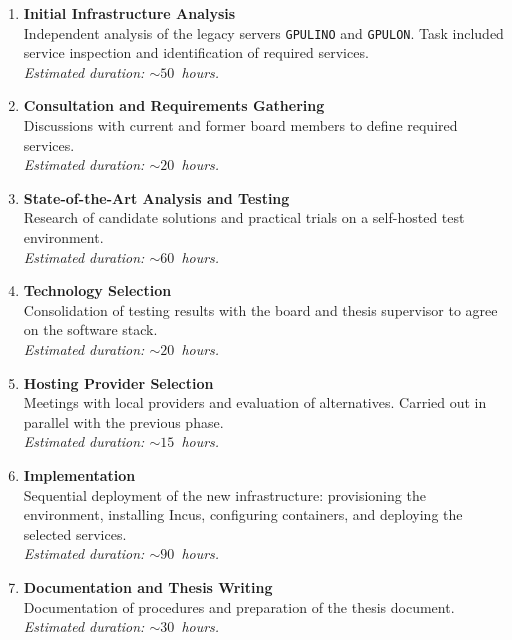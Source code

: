\begin{enumerate}
  \item \textbf{Initial Infrastructure Analysis}\\
  Independent analysis of the legacy servers \texttt{GPULINO} and \texttt{GPULON}. Task included service inspection and identification of required services.\\
  \emph{Estimated duration: \(\sim 50\)~hours.}

  \item \textbf{Consultation and Requirements Gathering}\\
  Discussions with current and former board members to define required services.\\
  \emph{Estimated duration: \(\sim 20\)~hours.}

  \item \textbf{State-of-the-Art Analysis and Testing}\\
  Research of candidate solutions and practical trials on a self-hosted test environment.\\
  \emph{Estimated duration: \(\sim 60\)~hours.}

  \item \textbf{Technology Selection}\\
  Consolidation of testing results with the board and thesis supervisor to agree on the software stack.\\
  \emph{Estimated duration: \(\sim 20\)~hours.}

  \item \textbf{Hosting Provider Selection}\\
  Meetings with local providers and evaluation of alternatives. Carried out in parallel with the previous phase.\\
  \emph{Estimated duration: \(\sim 15\)~hours.}

  \item \textbf{Implementation}\\
  Sequential deployment of the new infrastructure: provisioning the environment, installing Incus, configuring containers, and deploying the selected services.\\
  \emph{Estimated duration: \(\sim 90\)~hours.}

  \item \textbf{Documentation and Thesis Writing}\\
  Documentation of procedures and preparation of the thesis document.\\
  \emph{Estimated duration: \(\sim 30\)~hours.}

\end{enumerate}

